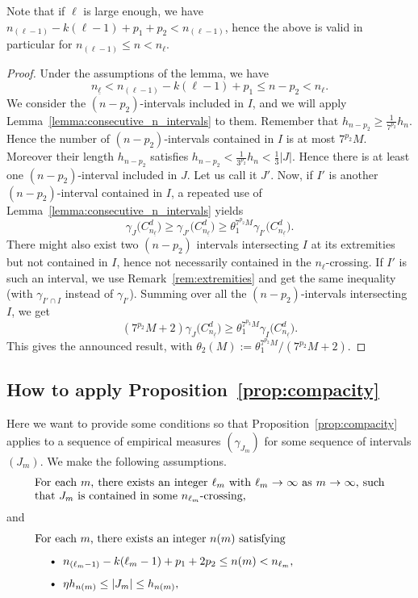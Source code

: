 \documentclass[AHL,Unicode,longabstracts]{cedram}
\newcommand{\egdef}{:=}
\newcommand{\cd}{C^{d}}
\newcommand{\lb}{\underline{\ell}}
\newcommand{\Gam}[1]{\gamma_{#1}\bigl(\cd_{n_{\lb}}\bigr)}
\begin{document}
\begin{rema}
Note that if $\ell$ is large enough, we have $n_{(\ell-1)} -k(\ell-1)+p_1+p_2<n_{(\ell-1)}$, hence the above is valid in particular for $n_{(\ell-1)}\le n < n_\ell$.
\end{rema}


\begin{proof}
Under the assumptions of the lemma, we have
\[
n_{\lb}< n_{(\ell-1)} - k(\ell-1) + p_1 \le n-p_2 < n_\ell.
\]
We consider the $(n-p_2)$-intervals included in $I$, and we will apply Lemma~\ref{lemma:consecutive_n_intervals} to them. Remember that $h_{n-p_2}\ge \frac{1}{7^{p_2}}h_n$. Hence the number of $(n-p_2)$-intervals contained in $I$ is at most $7^{p_2} M$. Moreover their length $h_{n-p_2}$ satisfies $h_{n-p_2}<\frac{1}{3^{p_2}}h_n<\frac{1}{3}|J|$. Hence there is at least one $(n-p_2)$-interval included in $J$. Let us call it $J'$. Now, if $I'$ is another $(n-p_2)$-interval contained in $I$, a repeated use of Lemma~\ref{lemma:consecutive_n_intervals} yields
\[
\Gam{J}\ge\Gam{J'} \ge \theta_1^{7^{p_2}M} \Gam{I'}.
\]
There might also exist two $(n-p_2)$ intervals intersecting $I$ at its extremities but not contained in $I$, hence not necessarily contained in the $n_\ell$-crossing. If $I'$ is such an interval, we use Remark~\ref{rem:extremities} and get the same inequality (with $\gamma_{I'\cap I}$ instead of $\gamma_{I'}$). Summing over all the $(n-p_2)$-intervals intersecting $I$, we get
\[
\left(7^{p_2}M +2\right)\Gam{J} \ge \theta_1^{7^{p_2}M} \Gam{I}.
\]
This gives the announced result, with $\theta_2(M)\egdef
\theta_1^{7^{p_2}M}/\left(7^{p_2}M+2\right)$.
\end{proof}

\subsection{How to apply Proposition~\ref{prop:compacity}}

Here we want to provide some conditions so that Proposition~\ref{prop:compacity} applies to a sequence of empirical measures $(\gamma_{J_m})$ for some sequence of intervals $(J_m)$. We make the following assumptions.
\begin{equation}\label{eq:assumptionJm1}
\begin{minipage}[t]{0.9\textwidth}
For each $m$, there exists an integer $\ell_m$ with $\ell_m\to\infty$ as $m\to\infty$, such that $J_m$ is contained in some $n_{\ell_m}$-crossing,
\end{minipage}
\end{equation}
and
\begin{equation}\label{eq:assumptionJm2}
\begin{minipage}[t]{0.9\textwidth}
For each $m$, there exists an integer $n(m)$ satisfying
\begin{itemize}
\item $n_{(\ell_m-1)}-k(\ell_m-1) + p_1+ 2p_2 \le n(m)< n_{\ell_m}$,
\item $\eta h_{n(m)}\le |J_m| \le h_{n(m)},$
\end{itemize}
\end{minipage}
\end{equation}
\end{document}
